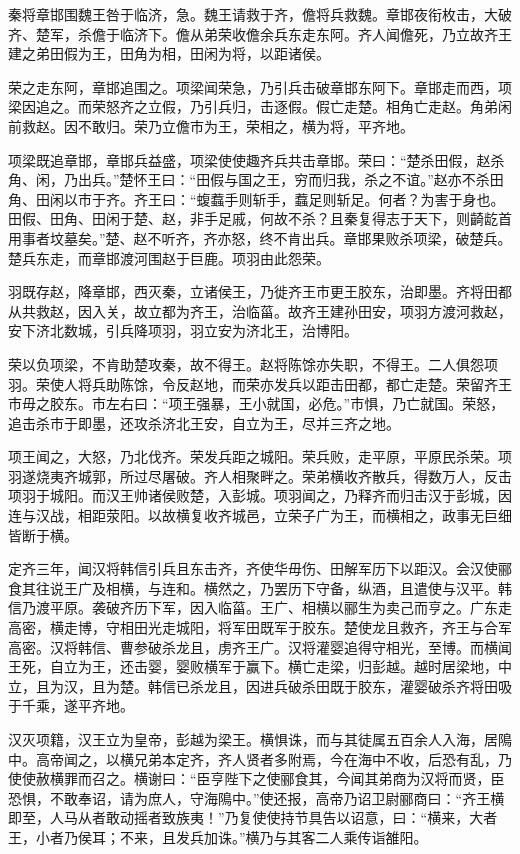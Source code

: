 \documentclass[]{article}
\begin{document}
秦将章邯围魏王咎于临济，急。魏王请救于齐，儋将兵救魏。章邯夜衔枚击，大破齐、楚军，杀儋于临济下。儋从弟荣收儋余兵东走东阿。齐人闻儋死，乃立故齐王建之弟田假为王，田角为相，田闲为将，以距诸侯。

荣之走东阿，章邯追围之。项梁闻荣急，乃引兵击破章邯东阿下。章邯走而西，项梁因追之。而荣怒齐之立假，乃引兵归，击逐假。假亡走楚。相角亡走赵。角弟闲前救赵。因不敢归。荣乃立儋市为王，荣相之，横为将，平齐地。

项梁既追章邯，章邯兵益盛，项梁使使趣齐兵共击章邯。荣曰：``楚杀田假，赵杀角、闲，乃出兵。''楚怀王曰：``田假与国之王，穷而归我，杀之不谊。''赵亦不杀田角、田闲以市于齐。齐王曰：``蝮蠚手则斩手，蠚足则斩足。何者？为害于身也。田假、田角、田闲于楚、赵，非手足戚，何故不杀？且秦复得志于天下，则齮龁首用事者坟墓矣。''楚、赵不听齐，齐亦怒，终不肯出兵。章邯果败杀项梁，破楚兵。楚兵东走，而章邯渡河围赵于巨鹿。项羽由此怨荣。

羽既存赵，降章邯，西灭秦，立诸侯王，乃徙齐王市更王胶东，治即墨。齐将田都从共救赵，因入关，故立都为齐王，治临菑。故齐王建孙田安，项羽方渡河救赵，安下济北数城，引兵降项羽，羽立安为济北王，治博阳。

荣以负项梁，不肯助楚攻秦，故不得王。赵将陈馀亦失职，不得王。二人俱怨项羽。荣使人将兵助陈馀，令反赵地，而荣亦发兵以距击田都，都亡走楚。荣留齐王市毋之胶东。市左右曰：``项王强暴，王小就国，必危。''市惧，乃亡就国。荣怒，追击杀市于即墨，还攻杀济北王安，自立为王，尽并三齐之地。

项王闻之，大怒，乃北伐齐。荣发兵距之城阳。荣兵败，走平原，平原民杀荣。项羽遂烧夷齐城郭，所过尽屠破。齐人相聚畔之。荣弟横收齐散兵，得数万人，反击项羽于城阳。而汉王帅诸侯败楚，入彭城。项羽闻之，乃释齐而归击汉于彭城，因连与汉战，相距荥阳。以故横复收齐城邑，立荣子广为王，而横相之，政事无巨细皆断于横。

定齐三年，闻汉将韩信引兵且东击齐，齐使华毋伤、田解军历下以距汉。会汉使郦食其往说王广及相横，与连和。横然之，乃罢历下守备，纵酒，且遣使与汉平。韩信乃渡平原。袭破齐历下军，因入临菑。王广、相横以郦生为卖己而亨之。广东走高密，横走博，守相田光走城阳，将军田既军于胶东。楚使龙且救齐，齐王与合军高密。汉将韩信、曹参破杀龙且，虏齐王广。汉将灌婴追得守相光，至博。而横闻王死，自立为王，还击婴，婴败横军于赢下。横亡走梁，归彭越。越时居梁地，中立，且为汉，且为楚。韩信已杀龙且，因进兵破杀田既于胶东，灌婴破杀齐将田吸于千乘，遂平齐地。

汉灭项籍，汉王立为皇帝，彭越为梁王。横惧诛，而与其徒属五百余人入海，居隝中。高帝闻之，以横兄弟本定齐，齐人贤者多附焉，今在海中不收，后恐有乱，乃使使赦横罪而召之。横谢曰：``臣亨陛下之使郦食其，今闻其弟商为汉将而贤，臣恐惧，不敢奉诏，请为庶人，守海隝中。''使还报，高帝乃诏卫尉郦商曰：``齐王横即至，人马从者敢动摇者致族夷！''乃复使使持节具告以诏意，曰：``横来，大者王，小者乃侯耳；不来，且发兵加诛。''横乃与其客二人乘传诣雒阳。
\end{document}
